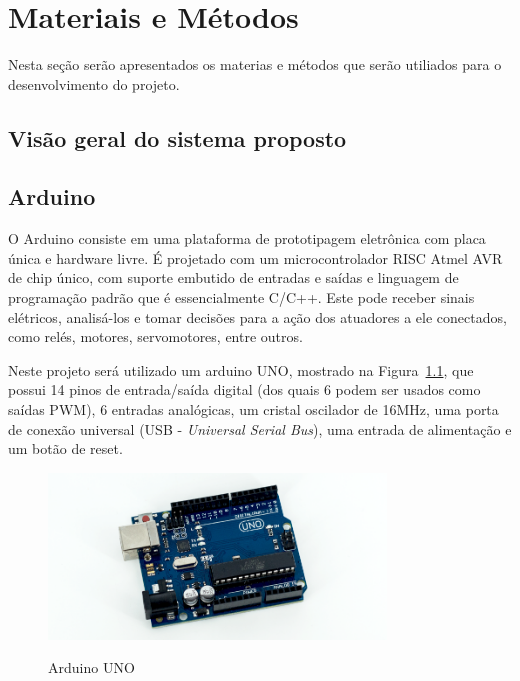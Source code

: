 \chapter{Materiais e Métodos}
\label{chap:mat_met}

Nesta seção serão apresentados os materias e métodos que serão utiliados para o desenvolvimento do projeto.

\section{Visão geral do sistema proposto}
\label{sec:visao}

\section{Arduino}
\label{sec:arduino}

O Arduino consiste em uma plataforma de prototipagem eletrônica com placa única e hardware livre. É projetado com um microcontrolador RISC Atmel AVR de chip único, com suporte embutido de entradas e saídas e linguagem de programação padrão que é essencialmente C/C++. Este pode receber sinais elétricos, analisá-los e tomar decisões para a ação dos atuadores a ele conectados, como relés, motores, servomotores, entre outros.

Neste projeto será utilizado um arduino UNO, mostrado na Figura~\ref{fig:arduino-uno}, que possui 14 pinos de entrada/saída digital (dos quais 6 podem ser usados como saídas PWM), 6 entradas analógicas, um cristal oscilador de 16MHz, uma porta de conexão universal (USB - \textit{Universal Serial Bus}), uma entrada de alimentação e um botão de reset.

\begin{figure}[!hbtp]
  \centering
   \caption{Arduino UNO}
    \includegraphics[width = 0.8\textwidth]{Caps/Figs/mat-met/arduino.png}
   \label{fig:arduino-uno}
\end{figure}

